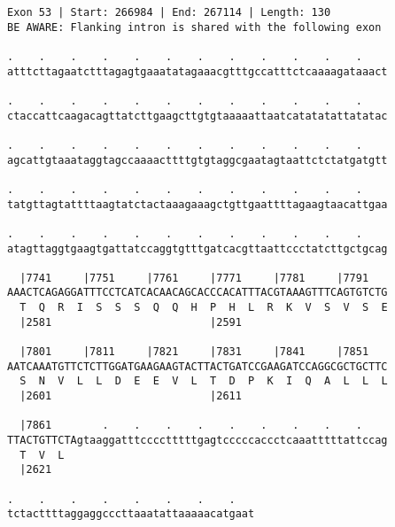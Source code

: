 \documentclass{article}
\begin{document}
\begin{Verbatim}[fontfamily=courier]
Exon 53 | Start: 266984 | End: 267114 | Length: 130
BE AWARE: Flanking intron is shared with the following exon

.    .    .    .    .    .    .    .    .    .    .    .    
atttcttagaatctttagagtgaaatatagaaacgtttgccatttctcaaaagataaact

.    .    .    .    .    .    .    .    .    .    .    .    
ctaccattcaagacagttatcttgaagcttgtgtaaaaattaatcatatatattatatac

.    .    .    .    .    .    .    .    .    .    .    .    
agcattgtaaataggtagccaaaacttttgtgtaggcgaatagtaattctctatgatgtt

.    .    .    .    .    .    .    .    .    .    .    .    
tatgttagtattttaagtatctactaaagaaagctgttgaattttagaagtaacattgaa

.    .    .    .    .    .    .    .    .    .    .    .    
atagttaggtgaagtgattatccaggtgtttgatcacgttaattccctatcttgctgcag

  |7741     |7751     |7761     |7771     |7781     |7791   
AAACTCAGAGGATTTCCTCATCACAACAGCACCCACATTTACGTAAAGTTTCAGTGTCTG
  T  Q  R  I  S  S  S  Q  Q  H  P  H  L  R  K  V  S  V  S  E
  |2581                         |2591                       

  |7801     |7811     |7821     |7831     |7841     |7851   
AATCAAATGTTCTCTTGGATGAAGAAGTACTTACTGATCCGAAGATCCAGGCGCTGCTTC
  S  N  V  L  L  D  E  E  V  L  T  D  P  K  I  Q  A  L  L  L
  |2601                         |2611                       

  |7861        .    .    .    .    .    .    .    .    .    
TTACTGTTCTAgtaaggatttcccctttttgagtcccccaccctcaaatttttattccag
  T  V  L                                                   
  |2621                                                     

.    .    .    .    .    .    .    .   
tctacttttaggaggcccttaaatattaaaaacatgaat
\end{Verbatim}
\newpage
\end{document}
